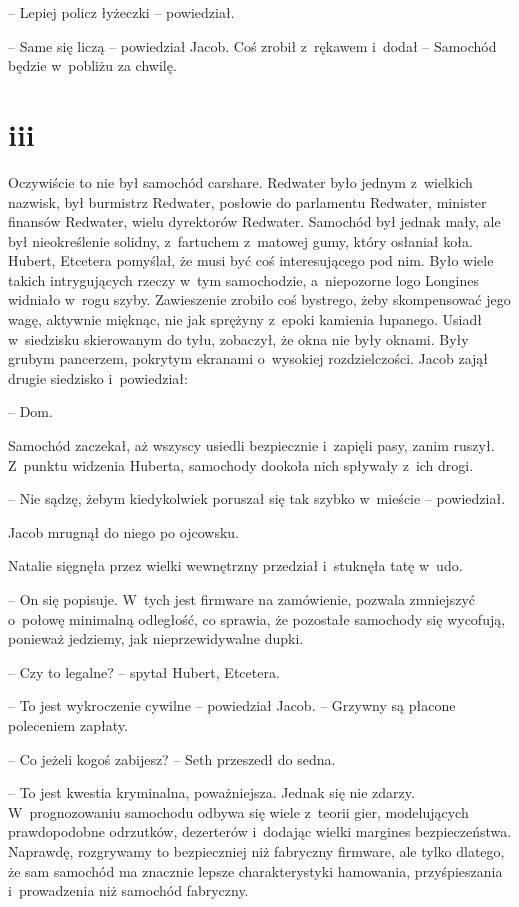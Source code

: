 \documentclass[oneside,polish,11pt,sfheadings]{mwbk}
\begin{document}
-- Lepiej policz łyżeczki -- powiedział.

-- Same się liczą -- powiedział Jacob. Coś zrobił z~rękawem i~dodał -- Samochód będzie w~pobliżu za chwilę.

\chapter*{iii}

Oczywiście to nie był samochód carshare. Redwater było jednym z~wielkich
nazwisk, był burmistrz Redwater, posłowie do parlamentu Redwater,
minister finansów Redwater, wielu dyrektorów Redwater. Samochód był
jednak mały, ale był nieokreślenie solidny, z~fartuchem z~matowej gumy,
który osłaniał koła. Hubert, Etcetera pomyślał, że musi być coś
interesującego pod nim. Było wiele takich intrygujących rzeczy w~tym
samochodzie, a~niepozorne logo Longines widniało w~rogu szyby.
Zawieszenie zrobiło coś bystrego, żeby skompensować jego wagę, aktywnie
mięknąc, nie jak sprężyny z~epoki kamienia łupanego. Usiadł w~siedzisku
skierowanym do tyłu, zobaczył, że okna nie były oknami. Były grubym
pancerzem, pokrytym ekranami o~wysokiej rozdzielczości. Jacob zajął
drugie siedzisko i~powiedział: 

-- Dom. 

Samochód zaczekał, aż wszyscy
usiedli bezpiecznie i~zapięli pasy, zanim ruszył. Z~punktu widzenia
Huberta, samochody dookoła nich spływały z~ich drogi.

-- Nie sądzę, żebym kiedykolwiek poruszał się tak szybko w~mieście -- powiedział.

Jacob mrugnął do niego po ojcowsku.

Natalie sięgnęła przez wielki wewnętrzny przedział i~stuknęła tatę w~udo. 

-- On się popisuje. W~tych jest firmware na zamówienie, pozwala
zmniejszyć o~połowę minimalną odległość, co sprawia, że pozostałe
samochody się wycofują, ponieważ jedziemy, jak nieprzewidywalne dupki.

-- Czy to legalne? -- spytał Hubert, Etcetera.

-- To jest wykroczenie cywilne -- powiedział Jacob. -- Grzywny są płacone
poleceniem zapłaty.

-- Co jeżeli kogoś zabijesz? -- Seth przeszedł do sedna.

-- To jest kwestia kryminalna, poważniejsza. Jednak się nie zdarzy. W~prognozowaniu samochodu odbywa się wiele z~teorii gier, modelujących
prawdopodobne odrzutków, dezerterów i~dodając wielki margines
bezpieczeństwa. Naprawdę, rozgrywamy to bezpieczniej niż fabryczny
firmware, ale tylko dlatego, że sam samochód ma znacznie lepsze
charakterystyki hamowania, przyśpieszania i~prowadzenia niż samochód
fabryczny.
\end{document}
